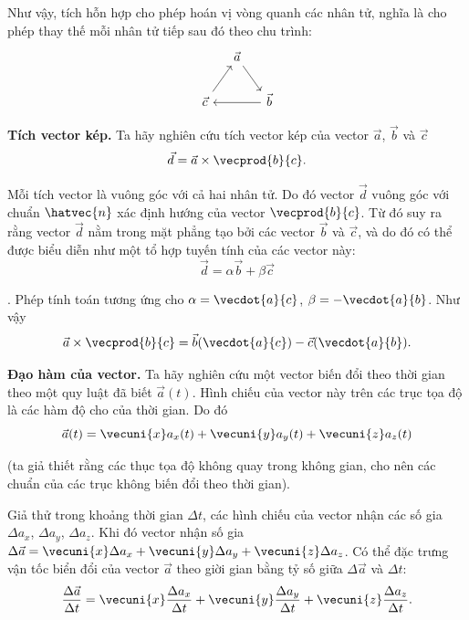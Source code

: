 \noindent
Như vậy, tích hỗn hợp cho phép hoán vị vòng quanh các nhân tử, nghĩa là cho phép thay thế mỗi nhân tử tiếp sau đó theo chu trình:
\begin{equation*}
\begin{tikzcd}[column sep=small]
             & \vec{a} \arrow[rd] &              \\
\vec{c} \arrow[ru] &              & \vec{b} \arrow[ll]
\end{tikzcd}
\end{equation*}

\textbf{Tích vector kép.} Ta hãy nghiên cứu tích vector kép của vector $\vec{a}$, $\vec{b}$ và $\vec{c}$
\begin{equation*}
\vec{d} = \vec{a}\times\vecprod{b}{c}.
\end{equation*}

\noindent
Mỗi tích vector là vuông góc với cả hai nhân tử. Do đó vector $\vec{d}$ vuông góc với chuẩn $\hatvec{n}$ xác định hướng của vector $\vecprod{b}{c}$. Từ đó suy ra rằng vector $\vec{d}$ nằm trong mặt phẳng tạo bởi các vector $\vec{b}$ và $\vec{c}$, và do đó có thể được biểu diễn như một tổ hợp tuyến tính của các vector này:
\begin{equation*}
\vec{d} = \alpha\vec{b} + \beta\vec{c}
\end{equation*}

. Phép tính toán tương ứng cho $\alpha=\vecdot{a}{c}$, $\beta=-\vecdot{a}{b}$. Như vậy
\begin{equation}\label{eq:1_35}
\vec{a}\times\vecprod{b}{c} = \vec{b}(\vecdot{a}{c}) - \vec{c}(\vecdot{a}{b}).
\end{equation}

\textbf{Đạo hàm của vector.} Ta hãy nghiên cứu một vector biến đổi theo thời gian theo một quy luật đã biết $\vec{a}(t)$. Hình chiếu của vector này trên các trục tọa độ là các hàm độ cho của thời gian. Do đó
\begin{equation}\label{eq:1_36}
\vec{a}(t) = \vecuni{x}a_x(t) + \vecuni{y}a_y(t) + \vecuni{z}a_z(t)
\end{equation}

\noindent
(ta giả thiết rằng các thục tọa độ không quay trong không gian, cho nên các chuẩn của các trục không biến đổi theo thời gian).

Giả thử trong khoảng thời gian $\Delta t$, các hình chiếu của vector nhận các số gia $\Delta a_x$, $\Delta a_y$, $\Delta a_z$. Khi đó vector nhận số gia $\Delta\vec{a} = \vecuni{x}\Delta a_x + \vecuni{y}\Delta a_y + \vecuni{z}\Delta a_z$. Có thể đặc trưng vận tốc biển đổi của vector $\vec{a}$ theo giời gian bằng tỷ số giữa $\Delta\vec{a}$ và $\Delta t$:
\begin{equation}\label{eq:1_37}
\frac{\Delta\vec{a}}{\Delta t} = \vecuni{x}\frac{\Delta a_x}{\Delta t} + \vecuni{y}\frac{\Delta a_y}{\Delta t} + \vecuni{z}\frac{\Delta a_z}{\Delta t}.
\end{equation}

